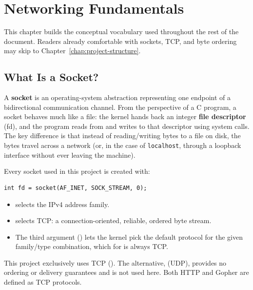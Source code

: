 \chapter{Networking Fundamentals}
\label{chap:networking-fundamentals}

This chapter builds the conceptual vocabulary used throughout the rest of the document. Readers already comfortable with sockets, TCP, and byte ordering may skip to Chapter~\ref{chap:project-structure}.

\section{What Is a Socket?}

A \textbf{socket} is an operating-system abstraction representing one endpoint of a bidirectional communication channel. From the perspective of a C program, a socket behaves much like a file: the kernel hands back an integer \textbf{file descriptor} (fd), and the program reads from and writes to that descriptor using system calls. The key difference is that instead of reading/writing bytes to a file on disk, the bytes travel across a network (or, in the case of \texttt{localhost}, through a loopback interface without ever leaving the machine).

Every socket used in this project is created with:

\begin{lstlisting}[style=cstyle]
int fd = socket(AF_INET, SOCK_STREAM, 0);
\end{lstlisting}

\begin{itemize}
    \item {} selects the IPv4 address family.
    \item {} selects TCP: a connection-oriented, reliable, ordered byte stream.
    \item The third argument () lets the kernel pick the default protocol for the given family/type combination, which for  is always TCP.
\end{itemize}

\begin{note}
This project exclusively uses TCP (). The alternative,  (UDP), provides no ordering or delivery guarantees and is not used here. Both HTTP and Gopher are defined as TCP protocols.
\end{note}

